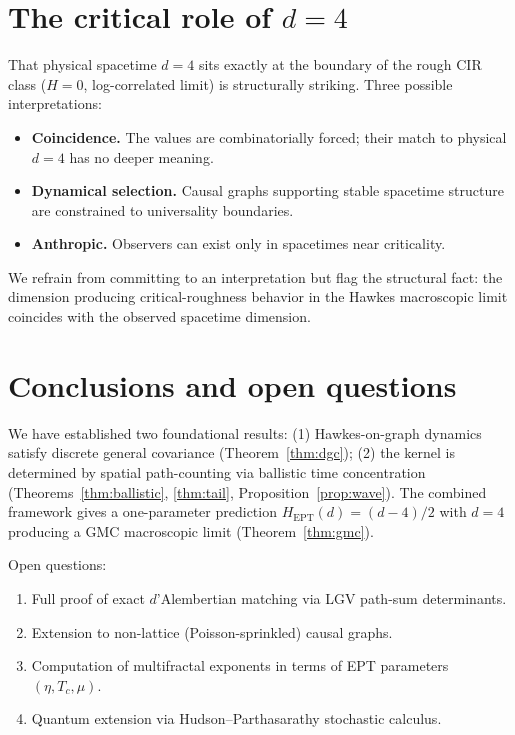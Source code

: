 \documentclass[11pt,a4paper]{article}
\begin{document}
\section{The critical role of $d = 4$}

That physical spacetime $d = 4$ sits exactly at the boundary of the rough CIR class ($H = 0$, log-correlated limit) is structurally striking. Three possible interpretations:
\begin{itemize}
\item \textbf{Coincidence.} The values are combinatorially forced; their match to physical $d = 4$ has no deeper meaning.
\item \textbf{Dynamical selection.} Causal graphs supporting stable spacetime structure are constrained to universality boundaries.
\item \textbf{Anthropic.} Observers can exist only in spacetimes near criticality.
\end{itemize}
We refrain from committing to an interpretation but flag the structural fact: the dimension producing critical-roughness behavior in the Hawkes macroscopic limit coincides with the observed spacetime dimension.

\section{Conclusions and open questions}

We have established two foundational results: (1) Hawkes-on-graph dynamics satisfy discrete general covariance (Theorem~\ref{thm:dgc}); (2) the kernel is determined by spatial path-counting via ballistic time concentration (Theorems~\ref{thm:ballistic}, \ref{thm:tail}, Proposition~\ref{prop:wave}). The combined framework gives a one-parameter prediction $H_{\mathrm{EPT}}(d) = (d-4)/2$ with $d = 4$ producing a GMC macroscopic limit (Theorem~\ref{thm:gmc}).

Open questions:
\begin{enumerate}
\item[(A)] Full proof of exact $d$'Alembertian matching via LGV path-sum determinants.
\item[(B)] Extension to non-lattice (Poisson-sprinkled) causal graphs.
\item[(C)] Computation of multifractal exponents in terms of EPT parameters $(\eta, T_c, \mu)$.
\item[(D)] Quantum extension via Hudson--Parthasarathy stochastic calculus.
\end{enumerate}
\end{document}
